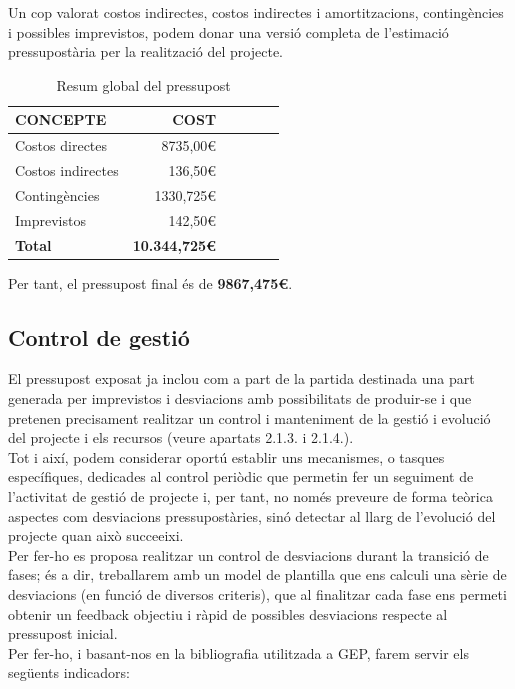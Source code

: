 Un cop valorat costos indirectes, costos indirectes i amortitzacions, contingències i possibles imprevistos, podem donar una versió completa de l’estimació pressupostària per la realització del projecte.

\begin{table}[htb]
\centering
\label{PressupostGlobal}
\begin{tabular}{lrrrrr}
\hline \textbf{CONCEPTE}                           &  \textbf{COST} \\
\hline
Costos directes                         & 8735,00\euro \\
Costos indirectes                         & 136,50\euro \\
Contingències                        & 1330,725\euro \\
Imprevistos                         & 142,50\euro \\
\hline
\textbf{Total}    &     \textbf{10.344,725\euro}       \\
\hline                      
\end{tabular}%
\caption{Resum global del pressupost}
\end{table}

Per tant, el pressupost final és de \textbf{9867,475\euro}.

\subsection{Control de gestió}

El pressupost exposat ja inclou com a part de la partida destinada una part generada per imprevistos i desviacions amb possibilitats de produir-se i que pretenen precisament realitzar un control i manteniment de la gestió i evolució del projecte i els recursos (veure apartats 2.1.3. i 2.1.4.). \\
Tot i així, podem considerar oportú establir uns mecanismes, o tasques específiques, dedicades al control periòdic que permetin fer un seguiment de l’activitat de gestió de projecte i, per tant, no només preveure de forma teòrica aspectes com desviacions pressupostàries, sinó detectar al llarg de l’evolució del projecte quan això succeeixi. \\
Per fer-ho es proposa realitzar un control de desviacions durant la transició de fases; és a dir, treballarem amb un model de plantilla que ens calculi una sèrie de desviacions (en funció de diversos criteris), que al finalitzar cada fase ens permeti obtenir un feedback objectiu i ràpid de possibles desviacions respecte al pressupost inicial. \\
Per fer-ho, i basant-nos en la bibliografia utilitzada a GEP, farem servir els següents indicadors:

